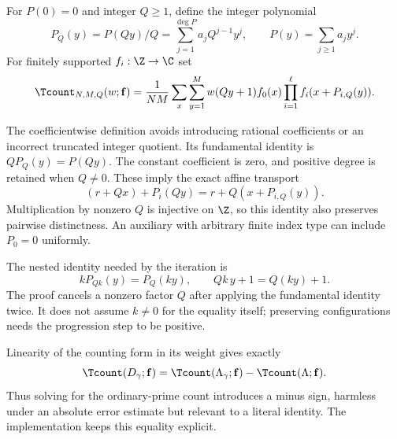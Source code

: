 \begin{definition}\label{def:rescaling}
For $P(0)=0$ and integer $Q\geq1$, define the integer polynomial
\[
 P_Q(y)=P(Qy)/Q=\sum_{j=1}^{\deg P}a_jQ^{j-1}y^j,
 \qquad P(y)=\sum_{j\geq1}a_jy^j.
\]
For finitely supported $f_i:\Z\to\C$ set
\[
 \Tcount_{N,M,Q}(w;\mathbf f)=\frac1{NM}\sum_x\sum_{y=1}^M
 w(Qy+1)f_0(x)\prod_{i=1}^{\ell}f_i(x+P_{i,Q}(y)).
\]
\end{definition}
\ifDetailed
The coefficientwise definition avoids introducing rational coefficients or an incorrect truncated integer quotient. Its fundamental identity is $Q P_Q(y)=P(Qy)$. The constant coefficient is zero, and positive degree is retained when $Q\neq0$. These imply the exact affine transport
\[
 (r+Qx)+P_i(Qy)=r+Q(x+P_{i,Q}(y)).
\]
Multiplication by nonzero $Q$ is injective on $\Z$, so this identity also preserves pairwise distinctness. An auxiliary with arbitrary finite index type can include $P_0=0$ uniformly.

The nested identity needed by the iteration is
\[
 kP_{Qk}(y)=P_Q(ky),\qquad Qk\,y+1=Q(ky)+1.
\]
The proof cancels a nonzero factor $Q$ after applying the fundamental identity twice. It does not assume $k\neq0$ for the equality itself; preserving configurations needs the progression step to be positive.

Linearity of the counting form in its weight gives exactly
\[
 \Tcount(D_\gamma;\mathbf f)
 =\Tcount(\Lambda_\gamma;\mathbf f)-\Tcount(\Lambda;\mathbf f).
\]
Thus solving for the ordinary-prime count introduces a minus sign, harmless under an absolute error estimate but relevant to a literal identity. The implementation keeps this equality explicit.
\fi

